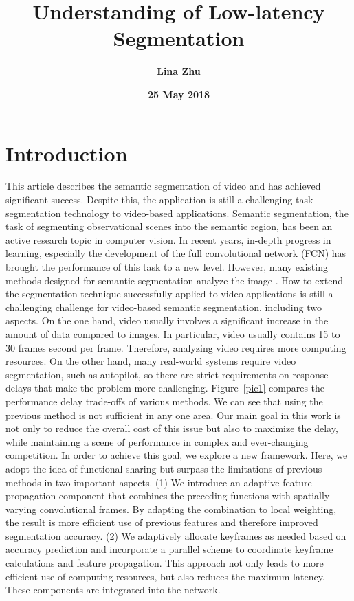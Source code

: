 \documentclass[a4paper,12pt]{article}
\begin{document}
%
 \title{\textbf{\bfseries \LARGE Understanding of Low-latency Segmentation } }
\author{\textbf{Lina Zhu}}
\date{\textbf{25 May 2018}}
\maketitle	
\section{Introduction}
 This article describes the semantic segmentation of video and has achieved significant success. Despite this, the application is still a challenging task segmentation technology to video-based applications. Semantic segmentation, the task of segmenting observational scenes into the semantic region, has been an active research topic in computer vision. In recent years, in-depth progress in learning, especially the development of the full convolutional network (FCN)\cite{Shelhamer_2015_Fully} has brought the performance of this task to a new level. However, many existing methods designed for semantic segmentation analyze the image \cite{Noh_2015_Learning}. How to extend the segmentation technique successfully applied to video applications is still a challenging challenge for video-based semantic segmentation, including two aspects. On the one hand, video usually involves a significant increase in the amount of data compared to images. In particular, video usually contains 15 to 30 frames second per frame. Therefore, analyzing video requires more computing resources. On the other hand, many real-world systems require video segmentation, such as autopilot, so there are strict requirements on response delays that make the problem more challenging. Figure~\ref{pic1} compares the performance delay trade-offs of various methods. We can see that using the previous method is not sufficient in any one area. Our main goal in this work is not only to reduce the overall cost of this issue but also to maximize the delay, while maintaining a scene of performance in complex and ever-changing competition. In order to achieve this goal, we explore a new framework. Here, we adopt the idea of functional sharing but surpass the limitations of previous methods in two important aspects. (1) We introduce an adaptive feature propagation component that combines the preceding functions with spatially varying convolutional frames. By adapting the combination to local weighting, the result is more efficient use of previous features and therefore improved segmentation accuracy. (2) We adaptively allocate keyframes as needed based on accuracy prediction and incorporate a parallel scheme to coordinate keyframe calculations and feature propagation. This approach not only leads to more efficient use of computing resources, but also reduces the maximum latency. These components are integrated into the network.
\end{document}
